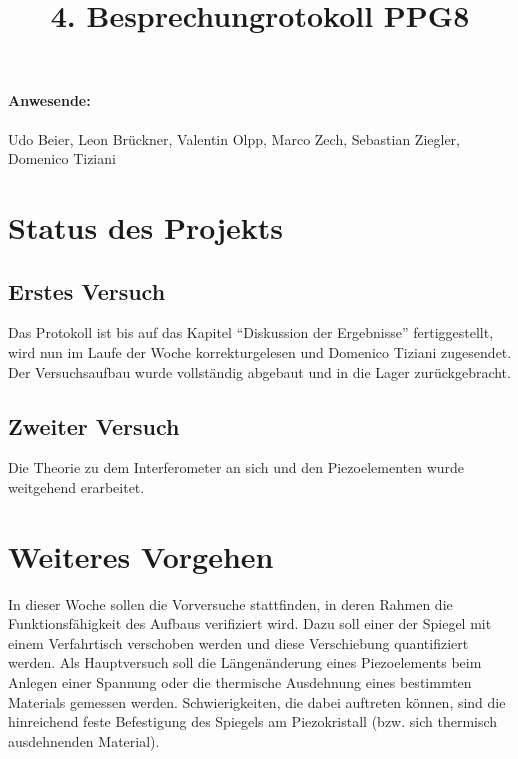 \documentclass[
]{scrartcl}
\begin{document}
\title{4. Besprechungrotokoll PPG8}
\maketitle

\paragraph{Anwesende:}
Udo Beier, Leon Brückner, Valentin Olpp, Marco Zech, Sebastian Ziegler, Domenico Tiziani


\section{Status des Projekts}

\subsection{Erstes Versuch}
Das Protokoll ist bis auf das Kapitel \enquote{Diskussion der Ergebnisse} fertiggestellt, wird nun im Laufe der Woche korrekturgelesen und Domenico Tiziani zugesendet. 
Der Versuchsaufbau wurde vollständig abgebaut und in die Lager zurückgebracht. 

\subsection{Zweiter Versuch}
Die Theorie zu dem Interferometer an sich und den Piezoelementen wurde weitgehend erarbeitet. 

\section{Weiteres Vorgehen}
In dieser Woche sollen die Vorversuche stattfinden, in deren Rahmen die Funktionsfähigkeit des Aufbaus verifiziert wird. 
Dazu soll einer der Spiegel mit einem Verfahrtisch verschoben werden und diese Verschiebung quantifiziert werden. 
Als Hauptversuch soll die Längenänderung eines Piezoelements beim Anlegen einer Spannung oder die thermische Ausdehnung 
eines bestimmten Materials gemessen werden.
Schwierigkeiten, die dabei auftreten können, sind die hinreichend feste Befestigung des Spiegels am Piezokristall (bzw. sich thermisch ausdehnenden Material). 
\end{document}
